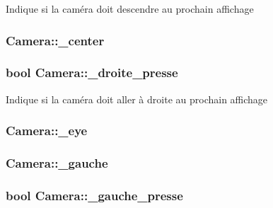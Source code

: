 Indique si la caméra doit descendre au prochain affichage \hypertarget{class_camera_ad80a82cbc81e6d8ba04c7cc1ac7ba0d7}{
\subsubsection[{\+\_\+center}]{ Camera\+::\+\_\+center\hspace{0.3cm}{\ttfamily [protected]}}}\label{class_camera_ad80a82cbc81e6d8ba04c7cc1ac7ba0d7}
\hypertarget{class_camera_a61b2e438537b99ba1f0a97e5586b7f45}{
\subsubsection[{\+\_\+droite\+\_\+presse}]{\setlength{\rightskip}{0pt plus 5cm}bool Camera\+::\+\_\+droite\+\_\+presse}}\label{class_camera_a61b2e438537b99ba1f0a97e5586b7f45}
Indique si la caméra doit aller à droite au prochain affichage \hypertarget{class_camera_ad4c22c27bd247f4411c4166220ba6e82}{
\subsubsection[{\+\_\+eye}]{ Camera\+::\+\_\+eye\hspace{0.3cm}{\ttfamily [protected]}}}\label{class_camera_ad4c22c27bd247f4411c4166220ba6e82}
\hypertarget{class_camera_aaf97dba7663b99065d8d508b589224de}{
\subsubsection[{\+\_\+gauche}]{ Camera\+::\+\_\+gauche\hspace{0.3cm}{\ttfamily [protected]}}}\label{class_camera_aaf97dba7663b99065d8d508b589224de}
\hypertarget{class_camera_ac2a5c37c4f9603a14e3616d6a75f7998}{
\subsubsection[{\+\_\+gauche\+\_\+presse}]{\setlength{\rightskip}{0pt plus 5cm}bool Camera\+::\+\_\+gauche\+\_\+presse}}\label{class_camera_ac2a5c37c4f9603a14e3616d6a75f7998}
